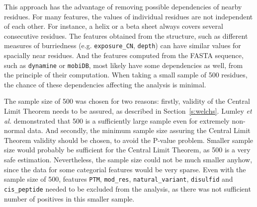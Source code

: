 This approach has the advantage of removing possible dependencies of nearby residues. For many features, the values of individual residues are not independent of each other. For instance, a helix or a beta sheet always covers several consecutive residues. The features obtained from the structure, such as different measures of burriedness (e.g. \texttt{exposure\_CN}, \texttt{depth}) can have similar values for spacially near residues. And the features computed from the FASTA sequence, such as \texttt{dynamine} or \texttt{mobiDB}, most likely have some dependencies as well, from the principle of their computation. When taking a small sample of 500 residues, the chance of these dependencies affecting the analysis is minimal.

The sample size of 500 was chosen for two reasons: firstly, validity of the Central Limit Theorem needs to be assured, as described in Section~\ref{s:welchs}. Lumley \textit{et al.} \cite{lumley} demonstrated that 500 is a sufficiently large sample even for extremely non-normal data. And secondly, the minimum sample size assuring the Central Limit Theorem validity should be chosen, to avoid the P-value problem. Smaller sample size would probably be sufficient for the Central Limit Theorem, as 500 is a very safe estimation. Nevertheless, the sample size could not be much smaller anyhow, since the data for some categorial features would be very sparse. Even with the sample size of 500, features \texttt{PTM}, \texttt{mod\_res}, \texttt{natural\_variant}, \texttt{disulfid} and \texttt{cis\_peptide} needed to be excluded from the analysis, as there was not sufficient number of positives in this smaller sample.

